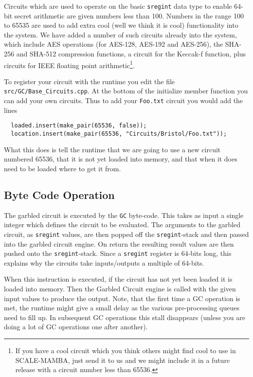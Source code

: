 Circuits which are used to operate on the basic \verb|sregint|
data type to enable 64-bit secret arithmetic are
given numbers less than 100.
Numbers in the range 100 to 65535 are used to add extra
cool (well we think it is cool) functionality into the
system.
We have added a number of such circuits already into the
system, which include AES operations (for AES-128, AES-192
and AES-256), the SHA-256 and SHA-512 compression functions,
a circuit for the Keccak-f function, plus circuits for
IEEE floating point arithmetic\footnote{If
you have a cool circuit which you think others might find
cool to use in SCALE-MAMBA, just send it to us and we
might include it in a future release with a circuit
number less than 65536.}.

To register your circuit with the runtime you edit the
file \verb|src/GC/Base_Circuits.cpp|. At the bottom of
the initialize member function you can add your
own circuits.
Thus to add your \verb|Foo.txt| circuit you would add
the lines
\begin{lstlisting}
  loaded.insert(make_pair(65536, false));
  location.insert(make_pair(65536, "Circuits/Bristol/Foo.txt"));
\end{lstlisting}
What this does is tell the runtime that we are going to
use a new circuit numbered 65536, that it is not yet loaded
into memory, and that when it does need to be loaded
where to get it from.

\subsection{Byte Code Operation}
The garbled circuit is executed by the \verb|GC| byte-code.
This takes as input a single integer which defines the
circuit to be evaluated.
The arguments to the garbled circuit, as \verb|sregint| values,
are then popped off the \verb|sregint|-stack and then passed
into the garbled circuit engine.
On return the resulting result values are then pushed
onto the \verb|sregint|-stack.
Since a \verb|sregint| register is 64-bits long, this
explains why the circuits take inputs/outputs a multiple
of 64-bits.

When this instruction is executed, if the circuit has
not yet been loaded it is loaded into memory. Then the
Garbled Circuit engine is called with the given input
values to produce the output.
Note, that the first time a GC operation is met, the
runtime might give a small delay as the various pre-processing
queues need to fill up.
In subsequent GC operations this stall disappears (unless
you are doing a lot of GC operations one after another).

